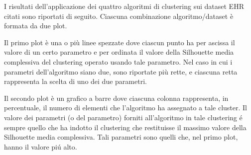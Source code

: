 \documentclass[a4paper, 12pt]{report}
\begin{document}
			I risultati dell'applicazione dei quattro algoritmi di clustering
			sui dataset EHR citati sono riportati di seguito. Ciascuna
			combinazione algoritmo/dataset è formata da due plot.

			Il primo plot è una o più linee spezzate dove ciascun punto ha per
			ascissa il valore di un certo parametro e per ordinata il valore
			della Silhouette media complessiva del clustering operato usando
			tale parametro. Nel caso in cui i parametri dell'algoritmo siano
			due, sono riportate più rette, e ciascuna retta rappresenta la
			scelta di uno dei due parametri.

			Il secondo plot è un grafico a barre dove ciascuna colonna
			rappresenta, in percentuale, il numero di elementi che
			l'algoritmo ha assegnato a tale cluster. Il valore dei
			parametri (o del parametro) forniti all'algoritmo in tale
			clustering é sempre quello che ha indotto il clustering che
			restituisse il massimo valore della Silhouette media complessiva.
			Tali parametri sono quelli che, nel primo plot, hanno il valore
			piú alto.
\end{document}
